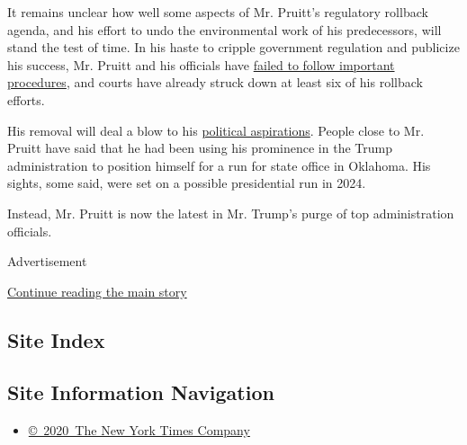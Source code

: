 It remains unclear how well some aspects of Mr. Pruitt's regulatory
rollback agenda, and his effort to undo the environmental work of his
predecessors, will stand the test of time. In his haste to cripple
government regulation and publicize his success, Mr. Pruitt and his
officials have
\href{https://www.nytimes.com/2018/04/07/climate/scott-pruitt-epa-rollbacks.html}{failed
to follow important procedures}, and courts have already struck down at
least six of his rollback efforts.

His removal will deal a blow to his
\href{https://www.nytimes.com/2018/03/17/climate/scott-pruitt-political-ambitions.html}{political
aspirations}. People close to Mr. Pruitt have said that he had been
using his prominence in the Trump administration to position himself for
a run for state office in Oklahoma. His sights, some said, were set on a
possible presidential run in 2024.

Instead, Mr. Pruitt is now the latest in Mr. Trump's purge of top
administration officials.

Advertisement

\protect\hyperlink{after-bottom}{Continue reading the main story}

\hypertarget{site-index}{%
\subsection{Site Index}\label{site-index}}

\hypertarget{site-information-navigation}{%
\subsection{Site Information
Navigation}\label{site-information-navigation}}

\begin{itemize}
\tightlist
\item
  \href{https://help.nytimes.com/hc/en-us/articles/115014792127-Copyright-notice}{©~2020~The
  New York Times Company}
\end{itemize}


